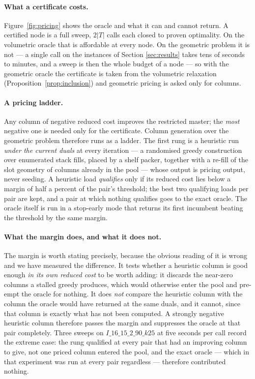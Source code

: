 \paragraph{What a certificate costs.}
Figure~\ref{fig:pricing} shows the oracle and what it can and cannot
return. A certified node is a full sweep, $2|T|$ calls each closed to
proven optimality. On the volumetric oracle that is affordable at every
node. On the geometric problem it is not --- a single call on the
instances of Section \ref{sec:results} takes tens of seconds to
minutes, and a sweep is then the whole budget of a node --- so with the
geometric oracle the certificate is taken from the volumetric
relaxation (Proposition~\ref{prop:inclusion}) and geometric pricing is
asked only for columns.

\paragraph{A pricing ladder.}
Any column of negative reduced cost improves the restricted master; the
\emph{most} negative one is needed only for the certificate. Column
generation over the geometric problem therefore runs as a ladder. The
first rung is a heuristic run \emph{under the current duals} at every
iteration --- a randomised greedy construction over enumerated stack
fills, placed by a shelf packer, together with a re-fill of the slot
geometry of columns already in the pool --- whose output is pricing
output, never seeding. A heuristic load \emph{qualifies} only if its
reduced cost lies below a margin of half a percent of the pair's
threshold; the best two qualifying loads per pair are kept, and a pair
at which nothing qualifies goes to the exact oracle. The oracle itself
is run in a stop-early mode that returns its first incumbent beating
the threshold by the same margin.

\paragraph{What the margin does, and what it does not.}
The margin is worth stating precisely, because the obvious reading of
it is wrong and we have measured the difference. It tests whether a
heuristic column is good enough \emph{in its own reduced cost} to be
worth adding: it discards the near-zero columns a stalled greedy
produces, which would otherwise enter the pool and pre-empt the oracle
for nothing. It does \emph{not} compare the heuristic column with the
column the oracle would have returned at the same duals, and it cannot,
since that column is exactly what has not been computed. A strongly
negative heuristic column therefore passes the margin and suppresses
the oracle at that pair completely. Three sweeps on
$I\_16\_15\_2\_90\_k25$ at five seconds per call record the extreme
case: the rung qualified at every pair that had an improving column to
give, not one priced column entered the pool, and the exact oracle ---
which in that experiment was run at every pair regardless --- therefore
contributed nothing.


